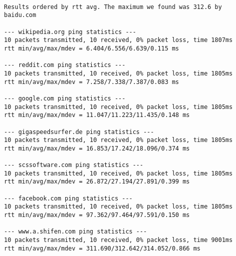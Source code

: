 \begin{lstlisting}

Results ordered by rtt avg. The maximum we found was 312.6 by baidu.com

--- wikipedia.org ping statistics ---
10 packets transmitted, 10 received, 0% packet loss, time 1807ms
rtt min/avg/max/mdev = 6.404/6.556/6.639/0.115 ms

--- reddit.com ping statistics ---
10 packets transmitted, 10 received, 0% packet loss, time 1805ms
rtt min/avg/max/mdev = 7.258/7.338/7.387/0.083 ms

--- google.com ping statistics ---
10 packets transmitted, 10 received, 0% packet loss, time 1805ms
rtt min/avg/max/mdev = 11.047/11.223/11.435/0.148 ms

--- gigaspeedsurfer.de ping statistics ---
10 packets transmitted, 10 received, 0% packet loss, time 1805ms
rtt min/avg/max/mdev = 16.853/17.242/18.096/0.374 ms

--- scssoftware.com ping statistics ---
10 packets transmitted, 10 received, 0% packet loss, time 1805ms
rtt min/avg/max/mdev = 26.872/27.194/27.891/0.399 ms

--- facebook.com ping statistics ---
10 packets transmitted, 10 received, 0% packet loss, time 1805ms
rtt min/avg/max/mdev = 97.362/97.464/97.591/0.150 ms

--- www.a.shifen.com ping statistics ---
10 packets transmitted, 10 received, 0% packet loss, time 9001ms
rtt min/avg/max/mdev = 311.690/312.642/314.052/0.866 ms

\end{lstlisting}